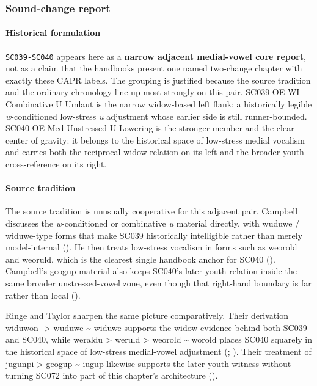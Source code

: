 \documentclass[
  british,
  a4paper,
]{article}
\begin{document}
\subsubsection{Sound-change report}\label{sound-change-report-24}

\paragraph{Historical formulation}\label{historical-formulation-24}

\texttt{SC039-SC040} appears here as a \textbf{narrow adjacent
medial-vowel core report}, not as a claim that the handbooks present one
named two-change chapter with exactly these CAPR labels. The grouping is
justified because the source tradition and the ordinary chronology line
up most strongly on this pair. SC039 OE WI Combinative U Umlaut is the
narrow widow-based left flank: a historically legible
\emph{w}-conditioned low-stress \emph{u} adjustment whose earlier side
is still runner-bounded. SC040 OE Med Unstressed U Lowering is the
stronger member and the clear center of gravity: it belongs to the
historical space of low-stress medial vocalism and carries both the
reciprocal widow relation on its left and the broader youth
cross-reference on its right.

\paragraph{Source tradition}\label{source-tradition-24}

The source tradition is unusually cooperative for this adjacent pair.
Campbell discusses the \emph{w}-conditioned or combinative \emph{u}
material directly, with wuduwe / widuwe-type forms that make SC039
historically intelligible rather than merely model-internal
(). He then treats
low-stress vocalism in forms such as weorold and weoruld, which is the
clearest single handbook anchor for SC040
(). Campbell's
geogup material also keeps SC040's later youth relation inside the same
broader unstressed-vowel zone, even though that right-hand boundary is
far rather than local ().

Ringe and Taylor sharpen the same picture comparatively. Their
derivation widuwon- \textgreater{} wuduwe \textasciitilde{} widuwe
supports the widow evidence behind both SC039 and SC040, while weraldu
\textgreater{} weruld \textgreater{} weorold \textasciitilde{} worold
places SC040 squarely in the historical space of low-stress medial-vowel
adjustment (;
). Their treatment of
jugunpi \textgreater{} geogup \textasciitilde{} iugup likewise supports
the later youth witness without turning SC072 into part of this
chapter's architecture ().
\end{document}
